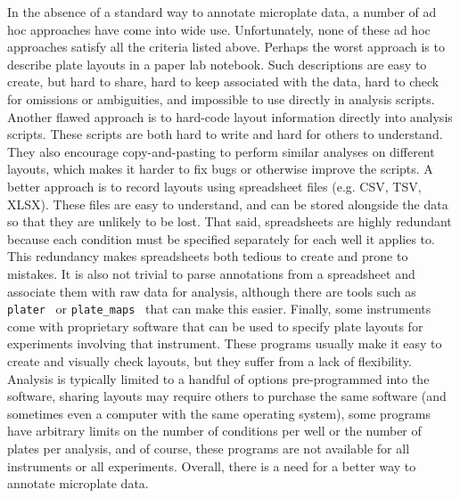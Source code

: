 \documentclass[twocolumn]{bmcart}
\begin{document}
In the absence of a standard way to annotate microplate data, a number of ad
hoc approaches have come into wide use. Unfortunately, none of these ad hoc
approaches satisfy all the criteria listed above.  Perhaps the worst approach
is to describe plate layouts in a paper lab notebook. Such descriptions are
easy to create, but hard to share, hard to keep associated with the data, hard
to check for omissions or ambiguities, and impossible to use directly in
analysis scripts.  Another flawed approach is to hard-code layout information
directly into analysis scripts. These scripts are both hard to write and hard
for others to understand. They also encourage copy-and-pasting to perform
similar analyses on different layouts, which makes it harder to fix bugs or
otherwise improve the scripts. A better approach is to record layouts using
spreadsheet files (e.g. CSV, TSV, XLSX). These files are easy to understand,
and can be stored alongside the data so that they are unlikely to be lost. That
said, spreadsheets are highly redundant because each condition must be
specified separately for each well it applies to. This redundancy makes
spreadsheets both tedious to create and prone to mistakes. It is also not
trivial to parse annotations from a spreadsheet and associate them with raw
data for analysis, although there are tools such as
\texttt{plater}~\cite{hughes2020} or \texttt{plate\_maps}~\cite{jones2014} that
can make this easier.  Finally, some instruments come with proprietary software
that can be used to specify plate layouts for experiments involving that
instrument.  These programs usually make it easy to create and visually check
layouts, but they suffer from a lack of flexibility. Analysis is typically
limited to a handful of options pre-programmed into the software, sharing
layouts may require others to purchase the same software (and sometimes even a
computer with the same operating system), some programs have arbitrary limits
on the number of conditions per well or the number of plates per analysis, and
of course, these programs are not available for all instruments or all
experiments. Overall, there is a need for a better way to annotate microplate
data.
\end{document}
